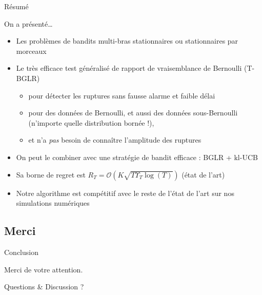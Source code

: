 \documentclass[11pt,french,ignorenonframetext,]{beamer}
\newcommand{\Fontify}{}
\providecommand{\tightlist}{%
  \setlength{\itemsep}{0pt}\setlength{\parskip}{0pt}}
\begin{document}
\begin{frame}{Résumé}

  On a présenté\ldots{}
  \begin{itemize}
    \item
    Les problèmes de bandits multi-bras stationnaires ou \alert{stationnaires par morceaux}
    \item
    Le très efficace test généralisé de rapport de vraisemblance de Bernoulli (T-BGLR) \dCooley{}
    \begin{itemize}\tightlist
      \item
      pour détecter les ruptures \alert{sans fausse alarme} et \alert{faible délai}
      \item
      pour des données de Bernoulli, et aussi des données sous-Bernoulli (n'importe quelle distribution bornée !),
      \item
      et n'a \emph{pas} besoin de connaître l'amplitude des ruptures
    \end{itemize}
    \item
    On peut le combiner avec une stratégie de bandit efficace :
    \alert{BGLR + kl-UCB}  \dCooley{}
    \item
    Sa borne de regret est $R_T = \mathcal{O}(K \sqrt{T \Upsilon_T \log(T)})$  \dCooley{} (état de l'art)
    \item
    Notre algorithme est compétitif avec le reste de l'état de l'art sur nos simulations numériques\dCooley
  \end{itemize}

\end{frame}

\subsection{Merci}
\begin{frame}{Conclusion}

\begin{center}
  \begin{Large}
    {\Fontify Merci de votre attention.}
    \Innocey[1.2]
  \end{Large}
\end{center}

\vspace*{20pt}

\begin{center}
  \begin{Large}
    Questions \& Discussion ?
  \end{Large}
\end{center}

\end{frame}
\end{document}
